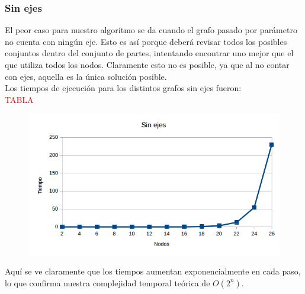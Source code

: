 \subsubsection{Sin ejes}
El peor caso para nuestro algoritmo se da cuando el grafo pasado por par\'ametro no cuenta con ning\'un eje. Esto es as\'i porque deber\'a revisar todos los posibles conjuntos dentro del conjunto de partes,
intentando encontrar uno mejor que el que utiliza todos los nodos. Claramente esto no es posible, ya que al no contar con ejes, aquella es la \'unica soluci\'on posible.\\

Los tiempos de ejecuci\'on para los distintos grafos sin ejes fueron:\\

\textcolor{red}{TABLA}

   \begin{figure}[h!]
   \begin{center}
 	\includegraphics[scale=0.7]{imagenes/exacto/Vacios.png}
	\label{Vacio}
   \end{center}
 \end{figure}

Aqu\'i se ve claramente que los tiempos aumentan exponencialmente en cada paso, lo que confirma nuestra complejidad temporal te\'orica de $O(2^n)$.
